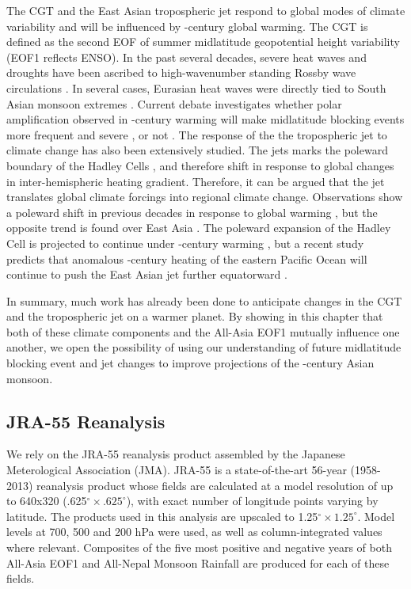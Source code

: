 	The CGT and the East Asian tropospheric jet respond to global modes of climate variability and will be influenced by -century global warming. The CGT is defined as the second EOF of summer midlatitude geopotential height variability (EOF1 reflects ENSO). In the past several decades, severe heat waves and droughts have been ascribed to high-wavenumber standing Rossby wave circulations \citep{Schubert2011}. In several cases, Eurasian heat waves were directly tied to South Asian monsoon extremes \citep{Lau2012,Trenberth2012}. Current debate investigates whether polar amplification observed in -century warming will make midlatitude blocking events more frequent and severe \citep{Francis2012}, or not \citep{Barnes2013,Hassanzadeh2014a}. The response of the the tropospheric jet to climate change has also been extensively studied. The jets marks the poleward boundary of the Hadley Cells \citep{Bordoni2008}, and therefore shift in response to global changes in inter-hemispheric heating gradient\citep{Chiang2012}. Therefore, it can be argued that the jet translates global climate forcings into regional climate change. Observations show a poleward shift in previous decades in response to global warming \citep{Fu2006,Archer2008,Fu2011}, but the opposite trend is found over East Asia \citep{Yu2007, Archer2008,Park2014a}. The poleward expansion of the Hadley Cell is projected to continue under -century warming \citep{Frierson2007,Lu2007,Kang2012}, but a recent study predicts that anomalous -century heating of the eastern Pacific Ocean will continue to push the East Asian jet further equatorward \citep{Park2014}.
	
	In summary, much work has already been done to anticipate changes in the CGT and the tropospheric jet on a warmer planet. By showing in this chapter that both of these climate components and the All-Asia EOF1 mutually influence one another, we open the possibility of using our understanding of future midlatitude blocking event and jet changes to improve projections of the -century Asian monsoon.


\subsection{JRA-55 Reanalysis}

	We rely on the JRA-55 reanalysis product assembled by the Japanese Meterological Association (JMA). JRA-55 is a state-of-the-art 56-year (1958-2013) reanalysis product whose fields are calculated at a model resolution of up to 640x320 (.625$^{\circ} \times .625^{\circ}$), with exact number of longitude points varying by latitude. The products used in this analysis are upscaled to 1.25$^{\circ} \times 1.25^{\circ}$. Model levels at 700, 500 and 200 hPa were used, as well as column-integrated values where relevant. Composites of the five most positive and negative years of both All-Asia EOF1 and All-Nepal Monsoon Rainfall are produced for each of these fields. 
		
